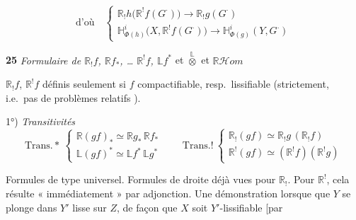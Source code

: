 \documentclass[11pt,a4paper]{article}
\begin{document}

\[
\text{d'où}\quad
\begin{cases}
\mathbb{R}_!h\bigl(\mathbb{R}^!f(G^{\cdot})\bigr)\longrightarrow\mathbb{R}_!g(G^{\cdot})\\
\mathbb{H}^{i}_{\Phi(h)}\bigl(X,\mathbb{R}^!f(G^{\cdot})\bigr)\longrightarrow\mathbb{H}^{i}_{\Phi(g)}(Y,G^{\cdot})
\end{cases}
\]

\textbf{25} \struck{\ill{}}  \emph{Formulaire de $\mathbb{R}_!f$, $\mathbb{R}f_{*}$, … $\mathbb{R}^!f$, $\mathbb{L}f^{*}$}
et $\overset{\mathbb{L}}{\otimes}$ et $\mathbb{R}\mathcal{H}om$

$\mathbb{R}_!f$, $\mathbb{R}^!f$ définis seulement si $f$ compactifiable, resp.\ lissifiable (strictement, i.e.\ pas de problèmes relatifs \ill{} ).

1°) \emph{Transitivités}
\[
\text{Trans.}*\ \begin{cases}
\mathbb{R}(gf)_{*}\simeq\mathbb{R}g_{*}\,\mathbb{R}f_{*}\\
\mathbb{L}(gf)^{*}\simeq\mathbb{L}f^{*}\,\mathbb{L}g^{*}
\end{cases}
\qquad
\text{Trans.}!\ \begin{cases}
\mathbb{R}_!(gf)\simeq\mathbb{R}_!g\,(\mathbb{R}_!f)\\
\mathbb{R}^!(gf)\simeq(\mathbb{R}^!f)(\mathbb{R}^!g)
\end{cases}
\]

Formules de type universel. Formules de droite déjà vues pour $\mathbb{R}_!$. Pour $\mathbb{R}^!$, cela résulte « immédiatement » par adjonction. Une démonstration  \ill{} lorsque  que $Y$ se plonge dans $Y'$ lisse sur $Z$, de façon que $X$ soit $Y'$-lissifiable [par \ill{} \ill{} \ill{}

\end{document}

